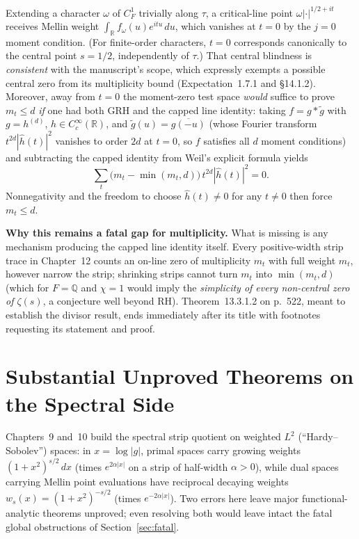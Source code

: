 \documentclass[11pt,letterpaper]{article}
\newcommand{\Q}{\mathbb{Q}}
\newcommand{\R}{\mathbb{R}}
\newcommand{\dd}{\,d}
\begin{document}
Extending a character $\omega$ of $C_F^1$ trivially along $\tau$, a critical-line point $\omega|\cdot|^{1/2+it}$ receives Mellin weight $\int_{\R} f_\omega(u)e^{itu}\dd u$, which vanishes at $t=0$ by the $j=0$ moment condition. (For finite-order characters, $t=0$ corresponds canonically to the central point $s=1/2$, independently of $\tau$.) That central blindness is \emph{consistent} with the manuscript's scope, which expressly exempts a possible central zero from its multiplicity bound (Expectation~1.7.1 and \S14.1.2). Moreover, away from $t=0$ the moment-zero test space \emph{would} suffice to prove $m_t\le d$ \emph{if} one had both GRH and the capped line identity: taking $f = g * \widetilde{g}$ with $g = h^{(d)}$, $h\in C_c^\infty(\R)$, and $\widetilde{g}(u)=\overline{g(-u)}$ (whose Fourier transform $t^{2d}|\widehat{h}(t)|^2$ vanishes to order $2d$ at $t=0$, so $f$ satisfies all $d$ moment conditions) and subtracting the capped identity from Weil's explicit formula yields
\[
  \sum_t \bigl(m_t - \min(m_t, d)\bigr)\, t^{2d}|\widehat{h}(t)|^2 = 0.
\]
Nonnegativity and the freedom to choose $\widehat{h}(t)\ne 0$ for any $t\ne 0$ then force $m_t\le d$.

\textbf{Why this remains a fatal gap for multiplicity.} What is missing is any mechanism producing the capped line identity itself. Every positive-width strip trace in Chapter~12 counts an on-line zero of multiplicity $m_t$ with full weight $m_t$, however narrow the strip; shrinking strips cannot turn $m_t$ into $\min(m_t,d)$ (which for $F=\Q$ and $\chi=1$ would imply the \emph{simplicity of every non-central zero of $\zeta(s)$}, a conjecture well beyond RH). Theorem~13.3.1.2 on p.~522, meant to establish the divisor result, ends immediately after its title with footnotes requesting its statement and proof.

\section{Substantial Unproved Theorems on the Spectral Side}
\label{sec:spectral}

Chapters~9 and~10 build the spectral strip quotient on weighted $L^2$ (``Hardy--Sobolev'') spaces: in $x=\log|g|$, primal spaces carry growing weights $(1+x^2)^{s/2}\dd x$ (times $e^{2\alpha|x|}$ on a strip of half-width $\alpha>0$), while dual spaces carrying Mellin point evaluations have reciprocal decaying weights $w_s(x) = (1+x^2)^{-s/2}$ (times $e^{-2\alpha|x|}$). Two errors here leave major functional-analytic theorems unproved; even resolving both would leave intact the fatal global obstructions of Section~\ref{sec:fatal}.
\end{document}
